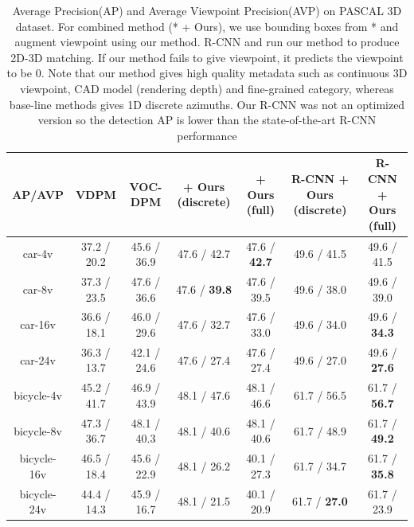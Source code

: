 \documentclass[10pt,twocolumn,letterpaper]{article}
\begin{document}
\begin{table}[!htbp]
    \footnotesize
  \begin{center}
\begin{tabular}{|c|c|c|c|c|c|c|}
\hline
AP/AVP              & VDPM \cite{Xiang14} & VOC-DPM \cite{Pepik12}  & \cite{Pepik12} + Ours (discrete) & \cite{Pepik12} + Ours (full) & R-CNN + Ours (discrete) & R-CNN + Ours (full)\\
\hline\hline
car-4v              & 37.2 / 20.2         & 45.6 / 36.9             & 47.6 / 42.7       & 47.6 / \textbf{42.7}        & 49.6 / 41.5         & 49.6 / 41.5\\ \hline
car-8v              & 37.3 / 23.5         & 47.6 / 36.6             & 47.6 / \textbf{39.8}       & 47.6 / 39.5        & 49.6 / 38.0         & 49.6 / 39.0\\ \hline
car-16v             & 36.6 / 18.1         & 46.0 / 29.6             & 47.6 / 32.7       & 47.6 / 33.0        & 49.6 / 34.0         & 49.6 / \textbf{34.3}\\ \hline
car-24v             & 36.3 / 13.7         & 42.1 / 24.6             & 47.6 / 27.4       & 47.6 / 27.4        & 49.6 / 27.0         & 49.6 / \textbf{27.6}\\ \hline
\hline
bicycle-4v          & 45.2 / 41.7         & 46.9 / 43.9             & 48.1 / 47.6       & 48.1 / 46.6        & 61.7 / 56.5         & 61.7 / \textbf{56.7}\\ \hline
bicycle-8v          & 47.3 / 36.7         & 48.1 / 40.3             & 48.1 / 40.6       & 48.1 / 40.6        & 61.7 / 48.9         & 61.7 / \textbf{49.2}\\ \hline
bicycle-16v         & 46.5 / 18.4         & 45.6 / 22.9             & 48.1 / 26.2       & 40.1 / 27.3        & 61.7 / 34.7         & 61.7 / \textbf{35.8}\\ \hline
bicycle-24v         & 44.4 / 14.3         & 45.9 / 16.7             & 48.1 / 21.5       & 40.1 / 20.9        & 61.7 / \textbf{27.0}         & 61.7 / 23.9\\ \hline
\end{tabular}
\end{center}
\caption{Average Precision(AP) and Average Viewpoint Precision(AVP) on PASCAL 3D dataset\cite{Xiang14}. For combined method (* + Ours), we use bounding boxes from * and augment viewpoint using our method. R-CNN and run our method to produce 2D-3D matching. If our method fails to give viewpoint, it predicts the viewpoint to be 0. Note that our method gives high quality metadata such as continuous 3D viewpoint, CAD model (rendering depth) and fine-grained category, whereas base-line methods gives 1D discrete azimuths. Our R-CNN was not an optimized version so the detection AP is lower than the state-of-the-art R-CNN performance}
\label{tab:pascal12}
\end{table}
\end{document}

